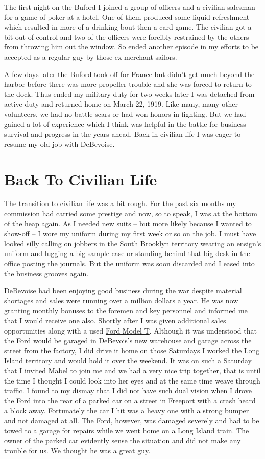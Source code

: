 \documentclass[12pt]{book}              %
\begin{document}
The first night on the Buford I joined a group of officers and a civilian salesman for a game of poker at a hotel. One of them produced some liquid refreshment which resulted in more of a drinking bout then a card game. The civilian got a bit out of control and two of the officers were forcibly restrained by the others from throwing him out the window. So ended another episode in my efforts to be accepted as a regular guy by those ex-merchant sailors. 

A few days later the Buford took off for France but didn't get much beyond the harbor before there was more propeller trouble and she was forced to return to the dock. Thus ended my military duty for two weeks later I was detached from active duty and returned home on March 22, 1919. Like many, many other volunteers, we had no battle scars or had won honors in fighting. But we had gained a lot of experience which I think was helpful in the battle for business survival and progress in the years ahead. Back in civilian life I was eager to resume my old job with DeBevoise. 

\chapter{Back To Civilian Life}

The transition to civilian life was a bit rough. For the past six months my commission had carried some prestige and now, so to speak, I was at the bottom of the heap again. As I needed new suits -- but more likely because I wanted to show-off -- I wore my uniform during my first week or so on the job. I must have looked silly calling on jobbers in the South Brooklyn territory wearing an ensign's uniform and lugging a big sample case or standing behind that big desk in the office posting the journals. But the uniform was soon discarded and I eased into the business grooves again.

DeBevoise had been enjoying good business during the war despite material shortages and sales were running over a million dollars a year. He was now granting monthly bonuses to the foremen and key personnel and informed me that I would receive one also. Shortly after I was given additional sales opportunities along with a used \href{http://en.wikipedia.org/wiki/Ford_Model_T}{Ford Model T}. Although it was understood that the Ford would be garaged in DeBevois's new warehouse and garage across the street from the factory, I did drive it home on those Saturdays I worked the Long Island territory and would hold it over the weekend. It was on such a Saturday that I invited Mabel to join me and we had a very nice trip together, that is until the time I thought I could look into her eyes and at the same time weave through traffic. I found to my dismay that I did not have such dual vision when I drove the Ford into the rear of a parked car on a street in Freeport with a crash heard a block away. Fortunately the car I hit was a heavy one with a strong bumper and not damaged at all. The Ford, however, was damaged severely and had to be towed to a garage for repairs while we went home on a Long Island train. The owner of the parked car evidently sense the situation and did not make any trouble for us. We thought he was a great guy. 
\end{document}
